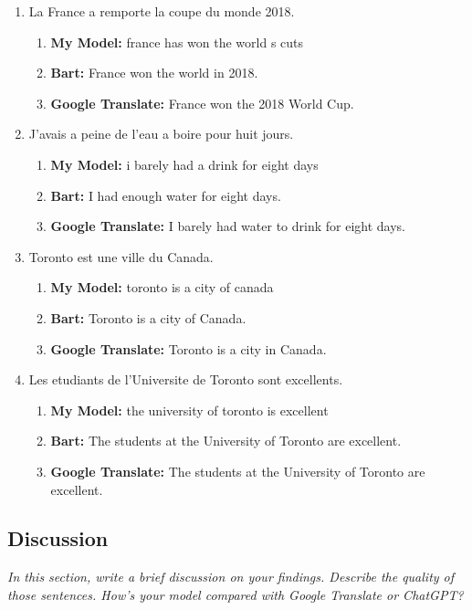 \documentclass[11pt]{article}
\begin{document}
\begin{enumerate}
\begin{enumerate}
  \end{enumerate}
  \item La France a remporte la coupe du monde 2018.
  \begin{enumerate}
    \item \textbf{My Model:} france has won the world s cuts
    \item \textbf{Bart:} France won the world in 2018.
    \item \textbf{Google Translate:} France won the 2018 World Cup.
  \end{enumerate}
  \item J'avais a peine de l'eau a boire pour huit jours.
  \begin{enumerate}
    \item \textbf{My Model:} i barely had a drink for eight days
    \item \textbf{Bart:} I had enough water for eight days.
    \item \textbf{Google Translate:} I barely had water to drink for eight days.
  \end{enumerate}
  \item Toronto est une ville du Canada.
  \begin{enumerate}
    \item \textbf{My Model:} toronto is a city of canada
    \item \textbf{Bart:} Toronto is a city of Canada.
    \item \textbf{Google Translate:} Toronto is a city in Canada.
  \end{enumerate}
  \item Les etudiants de l'Universite de Toronto sont excellents.
  \begin{enumerate}
    \item \textbf{My Model:} the university of toronto is excellent
    \item \textbf{Bart:} The students at the University of Toronto are excellent.
    \item \textbf{Google Translate:} The students at the University of Toronto are excellent.
  \end{enumerate}
\end{enumerate}

\subsection{Discussion}
{\it In this section, write a brief discussion on your findings. Describe the quality of
those sentences. How's your model compared with Google Translate or ChatGPT?}
\end{document}
